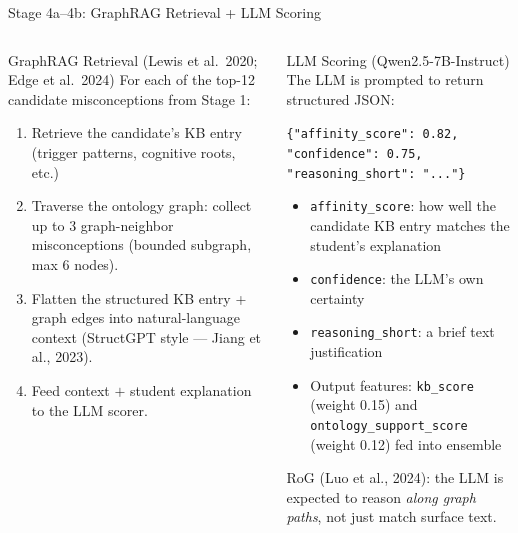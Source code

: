 ﻿\documentclass[aspectratio=169,10pt]{beamer}
\begin{document}
\begin{frame}{Stage 4a--4b: GraphRAG Retrieval + LLM Scoring}
\begin{columns}[T]
\begin{block}{GraphRAG Retrieval (Lewis et al.\ 2020; Edge et al.\ 2024)}
For each of the top-12 candidate misconceptions from Stage 1:
\begin{enumerate}
  \item Retrieve the candidate's KB entry (trigger patterns, cognitive roots, etc.)
  \item Traverse the ontology graph: collect up to 3 graph-neighbor misconceptions (bounded subgraph, max 6 nodes).
  \item Flatten the structured KB entry + graph edges into natural-language context (StructGPT style --- Jiang et al., 2023).
  \item Feed context $+$ student explanation to the LLM scorer.
\end{enumerate}
\end{block}
\begin{block}{LLM Scoring (Qwen2.5-7B-Instruct)}
The LLM is prompted to return structured JSON:
\begin{center}
\scriptsize
\texttt{\{"affinity\_score": 0.82,}\\
\texttt{\phantom{x}"confidence": 0.75,}\\
\texttt{\phantom{x}"reasoning\_short": "..."\}}
\end{center}
\begin{itemize}
  \item \texttt{affinity\_score}: how well the candidate KB entry matches the student's explanation
  \item \texttt{confidence}: the LLM's own certainty
  \item \texttt{reasoning\_short}: a brief text justification
  \item Output features: \texttt{kb\_score} (weight 0.15) and \texttt{ontology\_support\_score} (weight 0.12) fed into ensemble
\end{itemize}
RoG (Luo et al., 2024): the LLM is expected to reason \textit{along graph paths}, not just match surface text.
\end{block}
\end{columns}
\end{frame}
\end{document}
